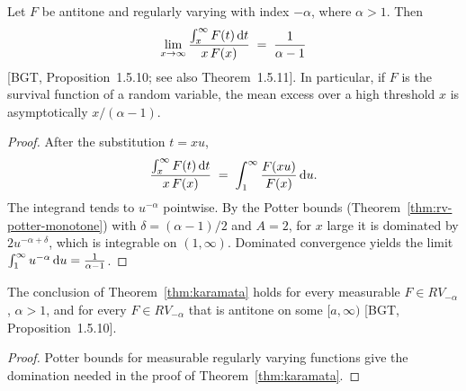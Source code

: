 \begin{theorem}
  \label{thm:karamata}
  \leanok
  Let $F$ be antitone and regularly varying with index $-\alpha$, where $\alpha > 1$. Then
  \begin{align*}
    \lim_{x \to \infty} \frac{\int_x^\infty F(t) \, \mathrm{d} t}{x \, F(x)} \; = \; \frac{1}{\alpha - 1}
  \end{align*}
  [BGT, Proposition~1.5.10; see also Theorem~1.5.11]. In particular, if $F$ is the survival
  function of a random variable, the mean excess over a high threshold $x$ is asymptotically
  $x/(\alpha - 1)$.
\end{theorem}
\begin{proof}
  \leanok
  After the substitution $t = x u$,
  \begin{align*}
    \frac{\int_x^\infty F(t) \, \mathrm{d} t}{x \, F(x)} \; = \; \int_1^\infty \frac{F(x u)}{F(x)} \, \mathrm{d} u .
  \end{align*}
  The integrand tends to $u^{-\alpha}$ pointwise. By the Potter bounds
  (Theorem~\ref{thm:rv-potter-monotone}) with $\delta = (\alpha-1)/2$ and $A = 2$, for $x$
  large it is dominated by $2 u^{-\alpha + \delta}$, which is integrable on $(1, \infty)$.
  Dominated convergence yields the limit $\int_1^\infty u^{-\alpha} \, \mathrm{d} u = \frac{1}{\alpha - 1}$.
\end{proof}

\begin{theorem}
  \label{thm:karamata-relaxed}
  \leanok
  The conclusion of Theorem~\ref{thm:karamata} holds for every measurable $F \in RV_{-\alpha}$,
  $\alpha > 1$, and for every $F \in RV_{-\alpha}$ that is antitone on some $[a, \infty)$
  [BGT, Proposition~1.5.10].
\end{theorem}
\begin{proof}
  \leanok
  Potter bounds for measurable regularly varying functions give the domination needed in the
  proof of Theorem~\ref{thm:karamata}.
\end{proof}


